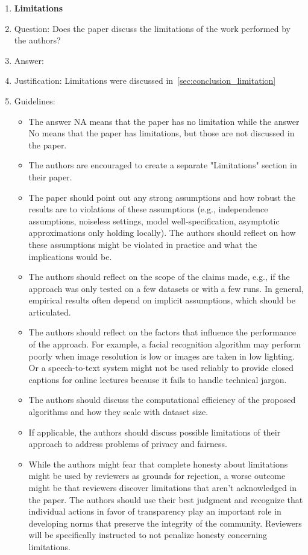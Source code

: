 \documentclass{article}
\begin{document}
\begin{enumerate}
\item {\bf Limitations}
    \item[] Question: Does the paper discuss the limitations of the work performed by the authors?
    \item[] Answer: \answerYes{} %
    \item[] Justification: Limitations were discussed in~\ref{sec:conclusion_limitation}
    \item[] Guidelines:
    \begin{itemize}
        \item The answer NA means that the paper has no limitation while the answer No means that the paper has limitations, but those are not discussed in the paper. 
        \item The authors are encouraged to create a separate "Limitations" section in their paper.
        \item The paper should point out any strong assumptions and how robust the results are to violations of these assumptions (e.g., independence assumptions, noiseless settings, model well-specification, asymptotic approximations only holding locally). The authors should reflect on how these assumptions might be violated in practice and what the implications would be.
        \item The authors should reflect on the scope of the claims made, e.g., if the approach was only tested on a few datasets or with a few runs. In general, empirical results often depend on implicit assumptions, which should be articulated.
        \item The authors should reflect on the factors that influence the performance of the approach. For example, a facial recognition algorithm may perform poorly when image resolution is low or images are taken in low lighting. Or a speech-to-text system might not be used reliably to provide closed captions for online lectures because it fails to handle technical jargon.
        \item The authors should discuss the computational efficiency of the proposed algorithms and how they scale with dataset size.
        \item If applicable, the authors should discuss possible limitations of their approach to address problems of privacy and fairness.
        \item While the authors might fear that complete honesty about limitations might be used by reviewers as grounds for rejection, a worse outcome might be that reviewers discover limitations that aren't acknowledged in the paper. The authors should use their best judgment and recognize that individual actions in favor of transparency play an important role in developing norms that preserve the integrity of the community. Reviewers will be specifically instructed to not penalize honesty concerning limitations.
    \end{itemize}


\end{enumerate}
\end{document}

